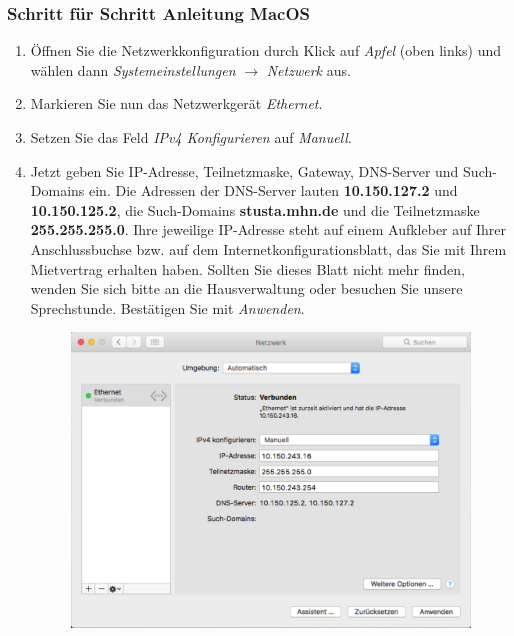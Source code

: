 \documentclass[a4paper,12pt]{scrartcl}
\begin{document}
\subsubsection*{Schritt für Schritt Anleitung MacOS}
\begin{enumerate}
    \item Öffnen Sie die Netzwerkkonfiguration durch Klick auf \emph{Apfel} (oben links) und wählen dann \emph{Systemeinstellungen} $\rightarrow$ \emph{Netzwerk} aus.
    \item Markieren Sie nun das Netzwerkgerät \emph{Ethernet}.
    \item Setzen Sie das Feld \emph{IPv4 Konfigurieren} auf \emph{Manuell}.
    \item Jetzt geben Sie IP-Adresse, Teilnetzmaske, Gateway, DNS-Server und Such-Domains ein. Die Adressen der DNS-Server lauten \textbf{10.150.127.2} und \textbf{10.150.125.2}, die Such-Domains \textbf{stusta.mhn.de} und die Teilnetzmaske \textbf{255.255.255.0}. Ihre jeweilige IP-Adresse steht auf einem Aufkleber auf Ihrer Anschlussbuchse bzw. auf dem Internetkonfigurationsblatt, das Sie mit Ihrem Mietvertrag erhalten haben. Sollten Sie dieses Blatt nicht mehr finden, wenden Sie sich bitte an die Hausverwaltung oder besuchen Sie unsere Sprechstunde. Bestätigen Sie mit \emph{Anwenden}.
      \begin{figure}[h!]
      \centering
        \begin{minipage}[c]{0.60\linewidth}
          \centering
          \includegraphics[width=0.9\linewidth,keepaspectratio]{Bilder/IP_MAC}
        \end{minipage}
      \vspace{-20pt}
      \end{figure}
\end{enumerate}
\vspace{-10pt}
\end{document}
